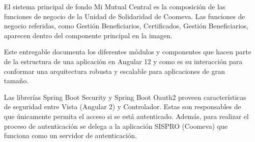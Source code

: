 \documentclass[
  paper=a4,
  ,captions=tableheading
]{scrartcl}
\begin{document}
El sistema principal de fondo Mi Mutual Central es la composición de las
funciones de negocio de la Unidad de Solidaridad de Coomeva. Las
funciones de negocio referidas, como Gestión Beneficiarios,
Certificados, Gestión Beneficiarios, aparecen dentro del componente
principal en la imagen.

Este entregable documenta los diferentes módulos y componentes que hacen
parte de la estructura de una aplicación en Angular 12 y como es su
interacción para conformar una arquitectura robusta y escalable para
aplicaciones de gran tamaño.

Las librerías Spring Boot Security y Spring Boot Oauth2 proveen
características de seguridad entre Vista (Angular 2) y Controlador.
Estas son responsables de que únicamente permita el acceso si se está
autenticado. Además, para realizar el proceso de autenticación se delega
a la aplicación SISPRO (Coomeva) que funciona como un servidor de
autenticación.
\end{document}
